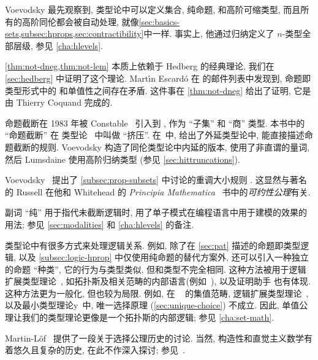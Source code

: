 Voevodsky 最先观察到, 类型论中可以定义集合, 纯命题, 和高阶可缩类型, 而且所有的高阶同伦都会被自动处理, 就像\cref{sec:basics-sets,subsec:hprops,sec:contractibility}中一样.
事实上, 他通过归纳定义了 $n$-类型全部层级, 参见 \cref{cha:hlevels}.%

\cref{thm:not-dneg,thm:not-lem} 本质上依赖于 Hedberg 的经典理论,
%
%
我们在 \cref{sec:hedberg} 中证明了这个理论.
Mart\'\i n Escard\'o 在 \Agda 的邮件列表中发现到, 命题即类型形式中的 \LEM{} 和单值性之间存在矛盾.
这件事在 \cref{thm:not-dneg} 给出了证明, 它是由 Thierry Coquand 完成的.

命题截断在 1983 年被 Constable~\cite{Con85} 引入到 , 作为 ``子集'' 和 ``商'' 类型.
本书中的 ``命题截断'' 在 \NuPRL 类型论~\cite{constable+86nuprl-book} 中叫做 ``挤压''.
在~\cite{ab:bracket-types}中, 给出了外延类型论中, 能直接描述命题截断的规则.
Voevodsky 构造了同伦类型论中内延的版本, 使用了非直谓的量词, 然后 Lumsdaine 使用高阶归纳类型 (参见 \cref{sec:hittruncations}).

%
Voevodsky~\cite{Universe-poly} 提出了 \cref{subsec:prop-subsets} 中讨论的重调大小规则 .
%
这显然与著名的 Russell 在他和 Whitehead 的 \emph{Principia Mathematica}~\cite{PM2} 书中的\emph{可约性公理}有关.

副词 ``纯'' 用于指代未截断逻辑时, 用了单子模式在编程语言中用于建模的效果的用法;
参见 \cref{sec:modalities} 和 \cref{cha:hlevels} 的备注.

类型论中有很多方式来处理逻辑关系.
例如, 除了在 \cref{sec:pat} 描述的命题即类型逻辑, 以及 \cref{subsec:logic-hprop} 中仅使用纯命题的替代方案外, 还可以引入一种独立的命题 ``种类'', 它的行为与类型类似, 但和类型不完全相同.
这种方法被用于逻辑扩展类型理论~\cite{aczel2002collection}, 如拓扑斯及相关范畴的内部语言(例如~\cite{jacobs1999categorical,elephant}), 以及证明助手 \Coq 也有体现.
这种方法更为一般化, 但也较为局限.
例如, 在 \Coq~\cite{Spiwack} 的集值范畴, 逻辑扩展类型理论~\cite{aczel2002collection}, 以及最小类型理论y~\cite{maietti2005toward}中, 唯一选择原理 (\cref{sec:unique-choice}) 不成立.
因此, 单值公理让我们的类型理论更像是一个拓扑斯的内部逻辑;
参见 \cref{cha:set-math}.

Martin-L\"of~\cite{martin2006100} 提供了一段关于选择公理历史的讨论.
当然, 构造性和直觉主义数学有着悠久且复杂的历史, 在此不作深入探讨;
参见~\cite{TroelstraI,TroelstraII}.
